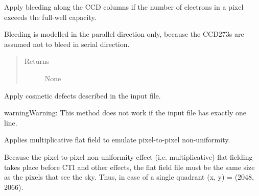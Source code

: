 \documentclass[a4paper,12pt,english]{sphinxmanual}
\begin{document}
\begin{fulllineitems}
\begin{fulllineitems}
\end{fulllineitems}


\begin{fulllineitems}
\label{simulator:simulator.simulator.VISsimulator.applyBleeding}
Apply bleeding along the CCD columns if the number of electrons in a pixel exceeds the full-well capacity.

Bleeding is modelled in the parallel direction only, because the CCD273s are assumed not to bleed in
serial direction.
\begin{quote}\begin{description}
\item[{Returns}] \leavevmode
None

\end{description}\end{quote}

\end{fulllineitems}


\begin{fulllineitems}
\label{simulator:simulator.simulator.VISsimulator.applyCosmetics}
Apply cosmetic defects described in the input file.

\begin{notice}{warning}{Warning:}
This method does not work if the input file has exactly one line.
\end{notice}

\end{fulllineitems}


\begin{fulllineitems}
\label{simulator:simulator.simulator.VISsimulator.applyFlatfield}
Applies multiplicative flat field to emulate pixel-to-pixel non-uniformity.

Because the pixel-to-pixel non-uniformity effect (i.e. multiplicative) flat fielding takes place
before CTI and other effects, the flat field file must be the same size as the pixels that see
the sky. Thus, in case of a single quadrant (x, y) = (2048, 2066).

\end{fulllineitems}


\end{fulllineitems}
\end{document}
